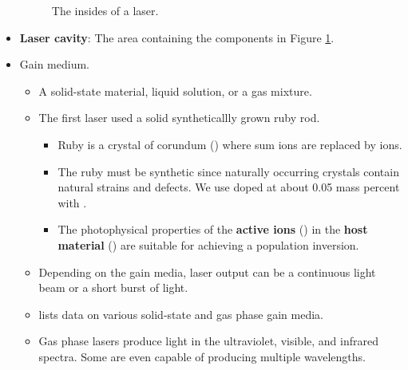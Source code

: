 \documentclass[../notes.tex]{subfiles}
\begin{document}
\begin{itemize}
\begin{figure}[h!]
        \caption{The insides of a laser.}
        \label{fig:laserInsides}
    \end{figure}
    \item \textbf{Laser cavity}: The area containing the components in Figure \ref{fig:laserInsides}.
    \item Gain medium.
    \begin{itemize}
        \item A solid-state material, liquid solution, or a gas mixture.
        \item The first laser used a solid syntheticallly grown ruby rod.
        \begin{itemize}
            \item Ruby is a crystal of corundum () where sum  ions are replaced by  ions.
            \item The ruby must be synthetic since naturally occurring crystals contain natural strains and defects. We use  doped at about 0.05 mass percent with .
            \item The photophysical properties of the \textbf{active ions} () in the \textbf{host material} () are suitable for achieving a population inversion.
        \end{itemize}
        \item Depending on the gain media, laser output can be a continuous light beam or a short burst of light.
        \item \textcite{bib:McQuarrieSimon} lists data on various solid-state and gas phase gain media.
        \item Gas phase lasers produce light in the ultraviolet, visible, and infrared spectra. Some are even capable of producing multiple wavelengths.

\end{itemize}
\end{itemize}
\end{document}
